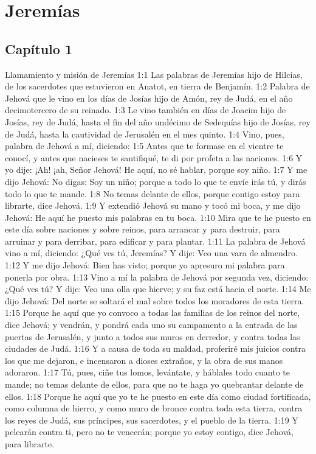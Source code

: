 \chapter{Jeremías}

\section*{Capítulo 1 }
Llamamiento y misión de Jeremías  1:1 Las palabras de Jeremías hijo de Hilcías, de los sacerdotes que estuvieron en Anatot, en tierra de Benjamín. 
1:2 Palabra de Jehová que le vino en los días de Josías hijo de Amón, rey de Judá, en el año decimotercero de su reinado. 
1:3 Le vino también en días de Joacim hijo de Josías, rey de Judá, hasta el fin del año undécimo de Sedequías hijo de Josías, rey de Judá, hasta la cautividad de Jerusalén en el mes quinto. 
1:4 Vino, pues, palabra de Jehová a mí, diciendo: 
1:5 Antes que te formase en el vientre te conocí, y antes que nacieses te santifiqué, te di por profeta a las naciones. 
1:6 Y yo dije: ¡Ah! ¡ah, Señor Jehová! He aquí, no sé hablar, porque soy niño. 
1:7 Y me dijo Jehová: No digas: Soy un niño; porque a todo lo que te envíe irás tú, y dirás todo lo que te mande. 
1:8 No temas delante de ellos, porque contigo estoy para librarte, dice Jehová. 
1:9 Y extendió Jehová su mano y tocó mi boca, y me dijo Jehová: He aquí he puesto mis palabras en tu boca. 
1:10 Mira que te he puesto en este día sobre naciones y sobre reinos, para arrancar y para destruir, para arruinar y para derribar, para edificar y para plantar. 
1:11 La palabra de Jehová vino a mí, diciendo: ¿Qué ves tú, Jeremías? Y dije: Veo una vara de almendro. 
1:12 Y me dijo Jehová: Bien has visto; porque yo apresuro mi palabra para ponerla por obra. 
1:13 Vino a mí la palabra de Jehová por segunda vez, diciendo: ¿Qué ves tú? Y dije: Veo una olla que hierve; y su faz está hacia el norte. 
1:14 Me dijo Jehová: Del norte se soltará el mal sobre todos los moradores de esta tierra. 
1:15 Porque he aquí que yo convoco a todas las familias de los reinos del norte, dice Jehová; y vendrán, y pondrá cada uno su campamento a la entrada de las puertas de Jerusalén, y junto a todos sus muros en derredor, y contra todas las ciudades de Judá. 
1:16 Y a causa de toda su maldad, proferiré mis juicios contra los que me dejaron, e incensaron a dioses extraños, y la obra de sus manos adoraron. 
1:17 Tú, pues, ciñe tus lomos, levántate, y háblales todo cuanto te mande; no temas delante de ellos, para que no te haga yo quebrantar delante de ellos. 
1:18 Porque he aquí que yo te he puesto en este día como ciudad fortificada, como columna de hierro, y como muro de bronce contra toda esta tierra, contra los reyes de Judá, sus príncipes, sus sacerdotes, y el pueblo de la tierra. 
1:19 Y pelearán contra ti, pero no te vencerán; porque yo estoy contigo, dice Jehová, para librarte. 
